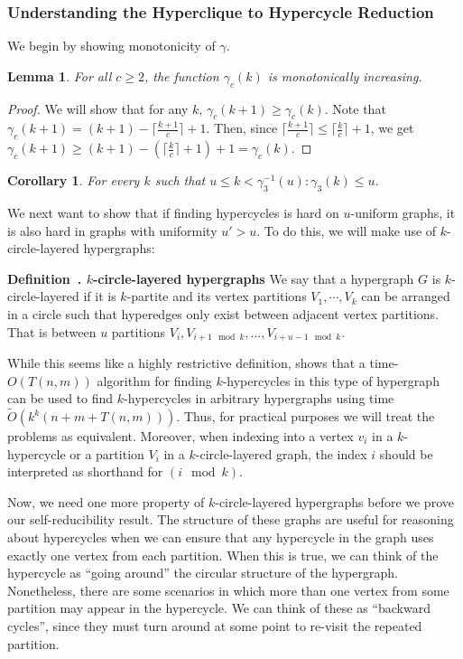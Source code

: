 \documentclass[11pt,letterpaper,pdftex]{article}
\newtheorem{lemma}[theorem]{Lemma}
\newtheorem{corollary}[theorem]{Corollary}
\newcounter{definition}
\newenvironment{definition}[1][]{\refstepcounter{definition}\par\medskip
   \noindent \textbf{Definition~\thedefinition. #1} \rmfamily}{\medskip}
\begin{document}
\subsubsection{Understanding the Hyperclique to Hypercycle Reduction}

We begin by showing monotonicity of $\gamma$.

\begin{lemma} \label{lem:gamma monotone}
    For all $c\geq2$, the function $\gamma_c(k)$ is monotonically increasing.
\end{lemma}
\begin{proof}
    We will show that for any $k$, $\gamma_c(k+1) \geq \gamma_c(k)$.
    Note that $\gamma_c(k+1)=(k+1)-\lceil \frac{k+1}{c} \rceil +1$.
    Then, since $\lceil \frac{k+1}{c} \rceil \leq \lceil \frac{k}{c} \rceil+1$, we get $\gamma_c(k+1) \geq (k+1)-(\lceil \frac{k}{c} \rceil+1)+1=\gamma_c(k)$.
\end{proof}

\begin{corollary}
For every $k$ such that $u\leq k<\gamma_3^{-1}(u):\gamma_3(k) \leq u$.
\end{corollary}

We next want to show that if finding hypercycles is hard on $u$-uniform graphs, it is also hard in graphs with uniformity $u'>u$. 
To do this, we will make use of $k$-circle-layered hypergraphs:

\begin{definition}[$k$-circle-layered hypergraphs]
    We say that a hypergraph $G$ is $k$-circle-layered if it is $k$-partite and its vertex partitions $V_1, \cdots, V_k$ can be arranged in a circle such that hyperedges only exist between adjacent vertex partitions. That is between $u$ partitions $V_i, V_{i+1 \mod k},...,V_{i+u-1 \mod k}$. 
\end{definition}

While this seems like a highly restrictive definition, \cite[Lemma~2.2]{LVW18} shows that a time-$O(T(n,m))$ algorithm for finding $k$-hypercycles in this type of hypergraph can be used to find $k$-hypercycles in arbitrary hypergraphs using time $\tilde{O}(k^k(n+m+T(n,m)))$.
Thus, for practical purposes we will treat the problems as equivalent.
Moreover, when indexing into a vertex $v_i$ in a $k$-hypercycle or a partition $V_i$ in a $k$-circle-layered graph, the index $i$ should be interpreted as shorthand for $(i \mod{k})$.



Now, we need one more property of $k$-circle-layered hypergraphs before we prove our self-reducibility result.
The structure of these graphs are useful for reasoning about hypercycles when we can ensure that any hypercycle in the graph uses exactly one vertex from each partition.
When this is true, we can think of the hypercycle as ``going around'' the circular structure of the hypergraph.
Nonetheless, there are some scenarios in which more than one vertex from some partition may appear in the hypercycle.
We can think of these as ``backward cycles'', since they must turn around at some point to re-visit the repeated partition.
\end{document}
